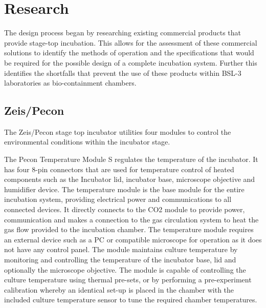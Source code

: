 \documentclass[class=report,11pt,crop=false]{standalone}
\begin{document}
	\chapter{Research} \label{ch:Research}
	\vspace{-1cm}
	
	The design process began by researching existing commercial products that provide stage-top incubation. This allows for the assessment of these commercial solutions to identify the methods of operation and the specifications that would be required for the possible design of a complete incubation system. Further this identifies the shortfalls that prevent the use of these products within BSL-3 laboratories as bio-containment chambers.
	
	\section{Zeis/Pecon}
	The Zeis/Pecon stage top incubator utilities four modules to control the environmental conditions within the incubator stage. 
	
	The Pecon Temperature Module S\cite{peconPeconZeisTempModule} regulates the temperature of the incubator. It has four 8-pin connectors that are used for temperature control of heated components such as the Incubator lid, incubator base, microscope objective and humidifier device. The temperature module is the base module for the entire incubation system, providing electrical power and communications to all connected devices. It directly connects to the CO2 module to provide power, communication and makes a connection to the gas circulation system to heat the gas flow provided to the incubation chamber. The temperature module requires an external device such as a PC or compatible microscope for operation as it does not have any control panel. The module maintains culture temperature by monitoring and controlling the temperature of the incubator base, lid and optionally the microscope objective. The module is capable of controlling the culture temperature using thermal pre-sets, or by performing a pre-experiment calibration whereby an identical set-up is placed in the chamber with the included culture temperature sensor to tune the required chamber temperatures. 
	
\end{document}
